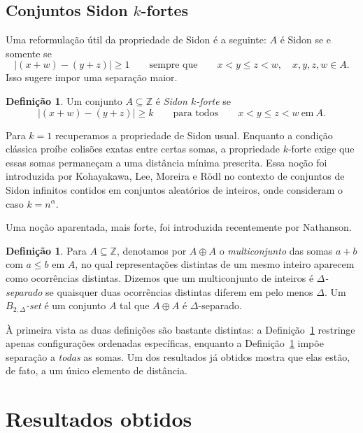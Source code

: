 \documentclass[11pt,a4paper]{article}
\theoremstyle{definition}
\newtheorem{definition}[theorem]{Definição}
\theoremstyle{remark}
\begin{document}
\subsection{Conjuntos Sidon \texorpdfstring{\(k\)}{k}-fortes}

Uma reformulação útil da propriedade de Sidon é a seguinte: \(A\) é
Sidon se e somente se
\[
  |(x+w)-(y+z)|\geq1
  \qquad\text{sempre que}\qquad
  x<y\leq z<w,\quad x,y,z,w\in A.
\]
Isso sugere impor uma separação maior.

\begin{definition}
  \label{def:k-forte}
  Um conjunto \(A\subseteq\mathbb Z\) é \emph{Sidon \(k\)-forte} se
  \[
    |(x+w)-(y+z)|\geq k
    \qquad\text{para todos}\qquad
    x<y\leq z<w\ \text{em}\ A .
  \]
\end{definition}

Para \(k=1\) recuperamos a propriedade de Sidon usual. Enquanto a
condição clássica proíbe colisões exatas entre certas somas, a
propriedade \(k\)-forte exige que essas somas permaneçam a uma distância
mínima prescrita. Essa noção foi introduzida por Kohayakawa, Lee,
Moreira e Rödl no contexto de conjuntos de Sidon infinitos contidos em
conjuntos aleatórios de inteiros, onde consideram o caso \(k=n^\alpha\).

Uma noção aparentada, mais forte, foi introduzida recentemente por
Nathanson.

\begin{definition}
  \label{def:bhdelta}
  Para \(A\subseteq\mathbb Z\), denotamos por \(A\oplus A\) o
  \emph{multiconjunto} das somas \(a+b\) com \(a\leq b\) em \(A\), no
  qual representações distintas de um mesmo inteiro aparecem como
  ocorrências distintas. Dizemos que um multiconjunto de inteiros é
  \emph{\(\Delta\)-separado} se quaisquer duas ocorrências distintas
  diferem em pelo menos \(\Delta\). Um \emph{\(B_{2,\Delta}\)-set} é um
  conjunto \(A\) tal que \(A\oplus A\) é \(\Delta\)-separado.
\end{definition}

À primeira vista as duas definições são bastante distintas: a
Definição~\ref{def:k-forte} restringe apenas configurações ordenadas
específicas, enquanto a Definição~\ref{def:bhdelta} impõe separação a
\emph{todas} as somas. Um dos resultados já obtidos mostra que elas
estão, de fato, a um único elemento de distância.

\section{Resultados obtidos}
\end{document}
